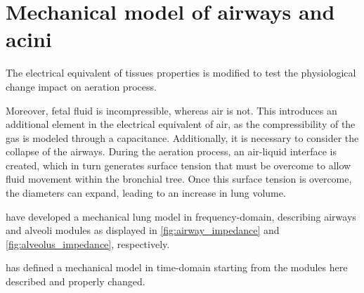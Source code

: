 \section{Mechanical model of airways and acini}




The electrical equivalent of tissues properties is modified to test
the physiological change impact on aeration process.


Moreover, fetal fluid is incompressible, whereas air is not. This
introduces an additional element in the electrical equivalent of air,
as the compressibility of the gas is modeled through a
capacitance. Additionally, it is necessary to consider the collapse of
the airways. During the aeration process, an air-liquid interface is
created, which in turn generates surface tension that must be overcome
to allow fluid movement within the bronchial tree. Once this surface
tension is overcome, the diameters can expand, leading to an increase
in lung volume.

\textcite{lutchen1997} have developed a mechanical lung model in
frequency-domain, describing airways and alveoli modules as displayed
in \cref{fig:airway_impedance} and \cref{fig:alveolus_impedance},
respectively.




\textcite{mani2020} has defined a mechanical model in time-domain starting
from the modules here described and properly changed.

